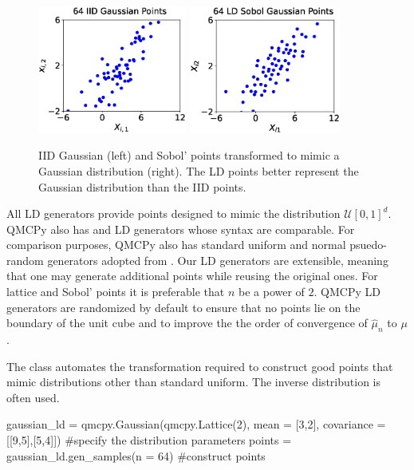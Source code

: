\documentclass[11pt]{NSFamsart}
\newcommand{\calu}{{\mathcal{U}}}
\newcommand{\hmu}{\hat{\mu}}
\begin{document}
\begin{figure}
	\centering
	\includegraphics[height = 4.2cm]{ProgramsImages/Gauss_IID.eps} 
	\includegraphics[height = 4.2cm]{ProgramsImages/Gauss_Sobol.eps}
	\caption{IID Gaussian (left) and Sobol'  points transformed to mimic a Gaussian distribution (right).  The LD points better represent the Gaussian distribution than the IID points. \label{fig:ld_Gauss}}
\end{figure}

All LD generators provide points designed to mimic the distribution $\calu[0,1]^d$.  QMCPy also has  \cite{DicPil10a} and  \cite{Hal60} LD generators whose syntax are comparable.  
For comparison purposes, QMCPy also has standard uniform and normal psuedo-random generators adopted from .  Our LD generators are extensible, meaning that one may generate additional points while reusing the original ones.  For lattice and Sobol' points it is preferable that $n$ be a power of $2$.  QMCPy LD generators are randomized by default to ensure that no points lie on the boundary of the unit cube and to improve the the order of convergence of $\hmu_n$ to $\mu$ \cite{Owe97}.

The  class automates the transformation required to construct good points that mimic distributions other than standard uniform.  The  inverse  distribution is often used.  
\begin{pythoncode}
gaussian_ld = qmcpy.Gaussian(qmcpy.Lattice(2), mean = [3,2], covariance = [[9,5],[5,4]])  #specify the distribution parameters 
points = gaussian_ld.gen_samples(n = 64)  #construct points
\end{pythoncode}
\end{document}
